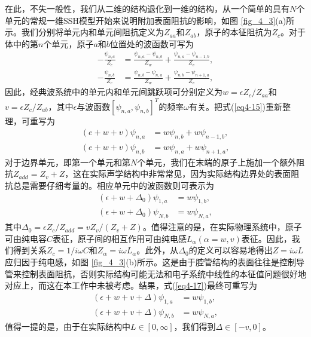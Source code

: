 在此，不失一般性，我们从二维的结构退化到一维的结构，从一个简单的具有\(N\)个单元的常规一维SSH模型开始来说明附加表面阻抗的影响，如图 \ref{fig_4_3}(a)所示。我们分别将单元内和单元间阻抗定义为\(Z_{aa}\)和\(Z_{ab}\)，原子的本征阻抗为\(Z_{c}\)。对于体中的第\(n\)个单元，原子\(a\)和\(b\)位置处的波函数可写为
\begin{equation}\label{eq4-15}
    \begin{split}
    -\frac{\psi_{n,a}}{Z_{c}} &= \frac{\psi_{n,a} - \psi_{n,b}}{Z_{w}} + \frac{\psi_{n,a} - \psi_{n - 1,b}}{Z_{v}},\\
    -\frac{\psi_{n,b}}{Z_{c}} &= \frac{\psi_{n,b} - \psi_{n,a}}{Z_{w}} + \frac{\psi_{n,b} - \psi_{n + 1,a}}{Z_{v}},
    \end{split}
\end{equation}
因此，经典波系统中的单元内和单元间跳跃项可分别定义为\(w = \epsilon Z_{c} / Z_{aa}\)和\(v = \epsilon Z_{c} / Z_{ab}\)，其中\(\epsilon\)与波函数\([\psi_{n,a},\psi_{n,b}]^T\)的频率\(\omega\)有关。把式(\ref{eq4-15})重新整理，可重写为
\begin{equation}\label{eq4-16}
    \begin{split}
    (e + w + v)\psi_{n,a} &= w\psi_{n,b} + w\psi_{n - 1,b},\\
    (e + w + v)\psi_{n,b} &= w\psi_{n,a} + w\psi_{n + 1,a},
    \end{split}
\end{equation}
对于边界单元，即第一个单元和第\(N\)个单元，我们在末端的原子上施加一个额外阻抗\(Z_{add}=Z_{v}+Z\)，这在实际声学结构中非常常见，因为实际结构边界处的表面阻抗总是需要仔细考量的。相应单元中的波函数则可表示为
\begin{equation}\label{eq4-17}
    \begin{split}
    (\epsilon + w + \Delta_0)\psi_{1,a} &= w\psi_{1,b},\\
    (\epsilon + w + \Delta_0)\psi_{N,b} &= w\psi_{N,a},
    \end{split}
    \end{equation}
其中\(\Delta_0 = \epsilon Z_{c} / Z_{add} = vZ_{v} / (Z_{v} + Z)\)。值得注意的是，在实际物理系统中，原子可由纯电容\(C\)表征，原子间的相互作用可由纯电感\(L_{\alpha} (\alpha = w,v)\)表征。因此，我们得到关系\(Z_{c} = 1 / i\omega C\)和\(Z_{\alpha} = i\omega L_{\alpha}\)。此外，从\(\Delta_0\)的定义可以容易地得出\(Z = i\omega L\)应归因于纯电感，如图 \ref{fig_4_3}(b)所示。这是由于腔管结构的表面往往是控制导管来控制表面阻抗，否则实际结构可能无法和电子系统中线性的本征值问题很好地对应上，而这在本工作中未被考虑。结果，式(\ref{eq4-17})最终可重写为
\begin{equation}\label{eq4-18}
    \begin{split}
    (\epsilon + w + v + \Delta)\psi_{1,a} &= w\psi_{1,b},\\
    (\epsilon + w + v + \Delta)\psi_{N,b} &= w\psi_{N,a},
    \end{split}
\end{equation}
值得一提的是，由于在实际结构中\(L \in [0,\infty]\)，我们得到\(\Delta \in [-v,0]\)。


